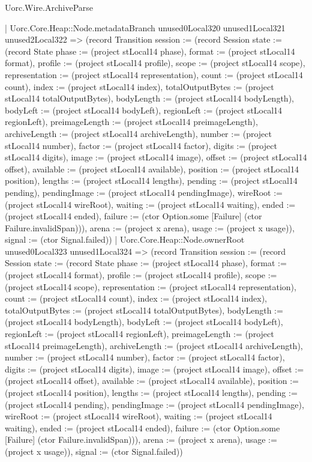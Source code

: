 \begin{lexlean}{Uorc.Wire.ArchiveParse}
\begin{semanticmodule}
{            | Uorc.Core.Heap::Node.metadataBranch unused0Local320 unused1Local321 unused2Local322 => (record Transition {session := (record Session {state := (record State {phase := (project stLocal14 phase), format := (project stLocal14 format), profile := (project stLocal14 profile), scope := (project stLocal14 scope), representation := (project stLocal14 representation), count := (project stLocal14 count), index := (project stLocal14 index), totalOutputBytes := (project stLocal14 totalOutputBytes), bodyLength := (project stLocal14 bodyLength), bodyLeft := (project stLocal14 bodyLeft), regionLeft := (project stLocal14 regionLeft), preimageLength := (project stLocal14 preimageLength), archiveLength := (project stLocal14 archiveLength), number := (project stLocal14 number), factor := (project stLocal14 factor), digits := (project stLocal14 digits), image := (project stLocal14 image), offset := (project stLocal14 offset), available := (project stLocal14 available), position := (project stLocal14 position), lengths := (project stLocal14 lengths), pending := (project stLocal14 pending), pendingImage := (project stLocal14 pendingImage), wireRoot := (project stLocal14 wireRoot), waiting := (project stLocal14 waiting), ended := (project stLocal14 ended), failure := (ctor Option.some [Failure] (ctor Failure.invalidSpan))}), arena := (project x arena), usage := (project x usage)}), signal := (ctor Signal.failed)})
            | Uorc.Core.Heap::Node.ownerRoot unused0Local323 unused1Local324 => (record Transition {session := (record Session {state := (record State {phase := (project stLocal14 phase), format := (project stLocal14 format), profile := (project stLocal14 profile), scope := (project stLocal14 scope), representation := (project stLocal14 representation), count := (project stLocal14 count), index := (project stLocal14 index), totalOutputBytes := (project stLocal14 totalOutputBytes), bodyLength := (project stLocal14 bodyLength), bodyLeft := (project stLocal14 bodyLeft), regionLeft := (project stLocal14 regionLeft), preimageLength := (project stLocal14 preimageLength), archiveLength := (project stLocal14 archiveLength), number := (project stLocal14 number), factor := (project stLocal14 factor), digits := (project stLocal14 digits), image := (project stLocal14 image), offset := (project stLocal14 offset), available := (project stLocal14 available), position := (project stLocal14 position), lengths := (project stLocal14 lengths), pending := (project stLocal14 pending), pendingImage := (project stLocal14 pendingImage), wireRoot := (project stLocal14 wireRoot), waiting := (project stLocal14 waiting), ended := (project stLocal14 ended), failure := (ctor Option.some [Failure] (ctor Failure.invalidSpan))}), arena := (project x arena), usage := (project x usage)}), signal := (ctor Signal.failed)})
}
\end{semanticmodule}
\end{lexlean}
